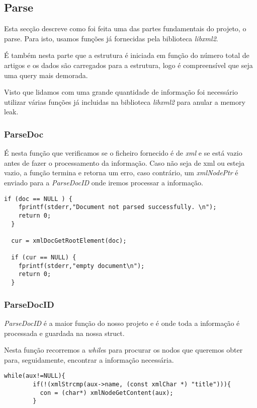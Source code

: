 \documentclass{article}
\begin{document}
\clearpage

\subsection{Parse}
\quad Esta secção descreve como foi feita uma das partes fundamentais do projeto, o parse. Para isto, usamos funções já fornecidas pela biblioteca \emph{libxml2}.
\par É também nesta parte que a estrutura é iniciada em função do número total de artigos e os dados são carregados para a estrutura, logo é compreensível que seja uma query mais demorada.
\par Visto que lidamos com uma grande quantidade de informação foi necessário utilizar várias funções já incluidas na biblioteca \emph{libxml2} para anular a memory leak.

\subsubsection{ParseDoc}
\par É nesta função que verificamos se o ficheiro fornecido é de \emph{xml} e se está vazio antes de fazer o processamento da informação. Caso não seja de xml ou esteja vazio, a função termina e retorna um erro, caso contrário, um \emph{xmlNodePtr} é enviado para a \emph{ParseDocID} onde iremos processar a informação.

\begin{lstlisting}
if (doc == NULL ) {
    fprintf(stderr,"Document not parsed successfully. \n");
    return 0;
  }

  cur = xmlDocGetRootElement(doc);

  if (cur == NULL) {
    fprintf(stderr,"empty document\n");
    return 0;
  }
\end{lstlisting}

\subsubsection{ParseDocID}
\par \emph{ParseDocID } é a maior função do nosso projeto e é onde toda a informação é processada e guardada na nossa struct.
\par Nesta função recorremos a \emph{while}s para procurar os nodos que queremos obter para, seguidamente, encontrar a informação necessária.

\begin{lstlisting}
while(aux!=NULL){
        if(!(xmlStrcmp(aux->name, (const xmlChar *) "title"))){
          con = (char*) xmlNodeGetContent(aux);
        }
\end{lstlisting}
\end{document}
